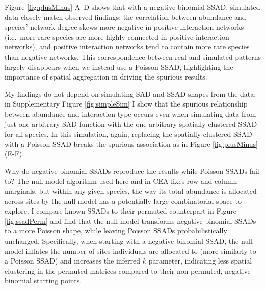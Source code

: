 \documentclass[]{article}
\begin{document}
Figure \ref{fig:plusMinus} A--D shows that with a negative binomial
SSAD, simulated data closely match observed findings: the correlation
between abundance and species' network degree skews more negative in
positive interaction networks (i.e.~more rare species are more highly
connected in positive interaction networks), and positive interaction
networks tend to contain more rare species than negative networks. This
correspondence between real and simulated patterns largely disappears
when we instead use a Poisson SSAD, highlighting the importance of
spatial aggregation in driving the spurious results.

My findings do not depend on simulating SAD and SSAD shapes from the
data: in Supplementary Figure \ref{fig:simpleSim} I show that the
spurious relationship between abundance and interaction type occurs even
when simulating data from just one arbitrary SAD function with the one
arbitrary spatially clustered SSAD for all species. In this simulation,
again, replacing the spatially clustered SSAD with a Poisson SSAD breaks
the spurious association as in Figure \ref{fig:plusMinus} (E-F).

Why do negative binomial SSADs reproduce the results while Poisson SSADs
fail to? The null model algorithm used here and in CEA fixes row and
column marginals, but within any given species, the way its total
abundance is allocated across sites by the null model has a potentially
large combinatorial space to explore. I compare known SSADs to their
permuted counterpart in Figure \ref{fig:ssadPerm} and find that the null
model transforms negative binomial SSADs to a more Poisson shape, while
leaving Poisson SSADs probabilistically unchanged. Specifically, when
starting with a negative binomial SSAD, the null model inflates the
number of sites individuals are allocated to (more similarly to a
Poisson SSAD) and increases the inferred \(k\) parameter, indicating
less spatial clustering in the permuted matrices compared to their
non-permuted, negative binomial starting points.
\end{document}
